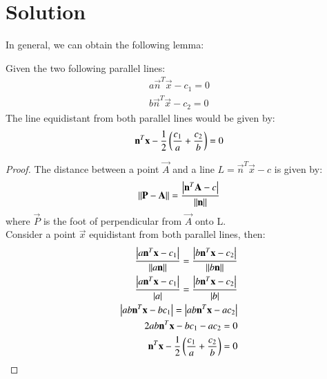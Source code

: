 \documentclass[journal,12pt,twocolumn]{IEEEtran}
\begin{document}
\section{Solution}
In general, we can obtain the following lemma:
\begin{lemma}
Given the two following parallel lines:
\begin{align}
    a\vec{n}^T\vec{x} - c_1 = 0\\
    b\vec{n}^T\vec{x} - c_2 = 0
    \label{ref}
\end{align}
The line equidistant from both parallel lines would be given by:
\begin{align}
    \mathbf{n}^T\mathbf{x} - \frac{1}{2}\left({\frac{c_1}{a} + \frac{c_2}{b}}\right) = 0
\end{align}
\end{lemma}
\begin{proof}
The distance between a point $\vec{A}$ and a line $L = \vec{n}^T\vec{x} - c$ is given by:
\begin{align}
    \left\lVert\mathbf{P} - \mathbf{A}\right\rVert = \frac{\left\vert\mathbf{n}^T \mathbf{A} - c\right\vert}{\left\lVert\mathbf{n}\right\rVert}
\end{align}
where $\vec{P}$ is the foot of perpendicular from $\vec{A}$ onto L.\\
Consider a point $\vec{x}$ equidistant from both parallel lines, then:
\begin{align}
    \frac{\left\vert a\mathbf{n}^T\mathbf{x} - c_1\right\vert}{\left\lVert a\mathbf{n}\right\rVert} = 
    \frac{\left\vert b\mathbf{n}^T\mathbf{x} - c_2\right\vert}{\left\lVert b\mathbf{n}\right\rVert}\\
      \frac{\left\vert a\mathbf{n}^T\mathbf{x} - c_1\right\vert}{\left\vert a\right\vert} = 
    \frac{\left\vert b\mathbf{n}^T\mathbf{x} - c_2\right\vert}{\left\vert b\right\vert}\\
      \left\vert ab\mathbf{n}^T\mathbf{x} - bc_1\right\vert = \left\vert ab\mathbf{n}^T\mathbf{x} - ac_2\right\vert\\
      2ab\mathbf{n}^T\mathbf{x} - bc_1 - ac_2 = 0\\
      \mathbf{n}^T\mathbf{x} - \frac{1}{2}\left({\frac{c_1}{a} + \frac{c_2}{b}}\right) = 0
      \label{ans}
      \end{align}
\end{proof}
\end{document}
